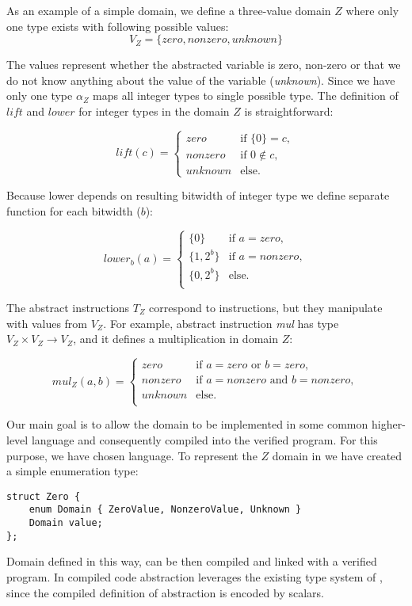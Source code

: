 As an example of a simple domain, we define a three-value domain $Z$ where only
one type exists with following possible values:
\[ V_{Z} = \{ \textit{zero}, \textit{nonzero}, \textit{unknown} \}\]


The values represent whether the abstracted variable is zero, non-zero or that
we do not know anything about the value of the variable (\emph{unknown}). Since
we have only one type $\alpha_{Z}$ maps all integer types to single possible
type.  The definition of $\textit{lift}$ and $\textit{lower}$ for integer types
in the domain $Z$ is straightforward:

\[
  lift(c) =
  \begin{cases}
    \textit{zero}    & \text{if } \{0\} = c, \\
    \textit{nonzero} & \text{if } 0 \not \in c, \\
    \textit{unknown} & \text{else.}
  \end{cases}
\]

\noindent
Because lower depends on resulting bitwidth of \LLVM integer type we define separate
function for each bitwidth ($b$):

\[
  lower_{b}(a) =
  \begin{cases}
    \{0\}      & \text{if } a = \textit{zero},\\
    \{1, 2^b\} & \text{if } a = \textit{nonzero}, \\
    \{0, 2^b\} & \text{else}. \\
  \end{cases}
\]

The abstract instructions $T_Z$ correspond to \LLVM instructions, but they
manipulate with values from $V_Z$. For example, abstract instruction \emph{mul}
has type $V_Z \times V_Z \rightarrow V_Z$, and it defines a multiplication in
domain $Z$:

\[
  mul_Z(a, b) =
  \begin{cases}
    \textit{zero}      & \text{if } a = \textit{zero} \text{ or } b = \textit{zero},\\
    \textit{nonzero}   & \text{if } a = \textit{nonzero} \text{ and } b = \textit{nonzero}, \\
    \textit{unknown}   & \text{else}. \\
  \end{cases}
\]

Our main goal is to allow the domain to be implemented in some common higher-level
language and consequently compiled into the verified program. For this purpose,
we have chosen \Cpp{} language. To represent the $Z$ domain in
\Cpp{} we have created a simple enumeration type:
\begin{verbatim}
struct Zero {
    enum Domain { ZeroValue, NonzeroValue, Unknown }
    Domain value;
};
\end{verbatim}
Domain defined in this way, can be then compiled and linked with a verified
program. In compiled code abstraction leverages the existing type system of
\LLVM, since the compiled definition of abstraction is encoded by \LLVM scalars.

